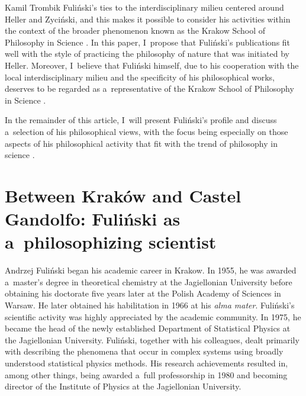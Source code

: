 \begin{artengenv}{Kamil Trombik}
Fuliński's ties to the interdisciplinary milieu centered around Heller and Zyciński, and this makes it possible to consider his activities within the context of the broader phenomenon known as the Krakow School of Philosophy in Science 
\parencites[][p.226]{trombik_koncepcje_2021}[][]{polak_krakow_2022}. %
 In this paper, I~propose that Fuliński's publications fit well with the style of practicing the philosophy of nature that was initiated by Heller. Moreover, I~believe that Fuliński himself, due to his cooperation with the local interdisciplinary milieu and the specificity of his philosophical works, deserves to be regarded as a~representative of the Krakow School of Philosophy in Science 
\parencite[see][]{polak_krakow_2022}.%




In the remainder of this article, I~will present Fuliński's profile and discuss a~selection of his philosophical views, with the focus being especially on those aspects of his philosophical activity that fit with the trend of philosophy in science 
\parencites[][]{polak_philosophy_2019}[][]{trombik_koncepcje_2021}.%




\section*{Between Kraków and Castel Gandolfo: Fuliński as a~philosophizing scientist}

Andrzej Fuliński began his academic career in Krakow. In 1955, he was awarded a~master's degree in theoretical chemistry at the Jagiellonian University before obtaining his doctorate five years later at the Polish Academy of Sciences in Warsaw. He later obtained his habilitation in 1966 at his \textit{alma mater}. Fuliński's scientific activity was highly appreciated by the academic community. In 1975, he became the head of the newly established Department of Statistical Physics at the Jagiellonian University. Fuliński, together with his colleagues, dealt primarily with describing the phenomena that occur in complex systems using broadly understood statistical physics methods. His research achievements resulted in, among other things, being awarded a~full professorship in 1980 and becoming director of the Institute of Physics at the Jagiellonian University.




\end{artengenv}

